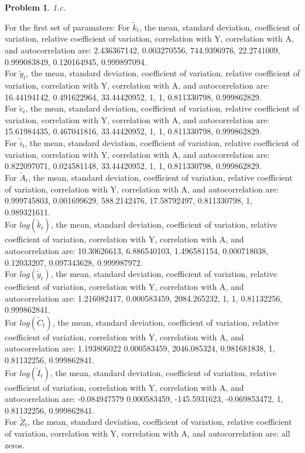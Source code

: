\documentclass{amsart}
\theoremstyle{plain}
\newtheorem{problem}{Problem}
\begin{document}
\begin{problem}
1.c.
\end{problem}
For the first set of paramaters:
For $\tilde{k}_t$, the mean, standard deviation, coefficient of variation, relative coefficient of variation, correlation with Y, correlation with A, and autocorrelation are: 2.436367142,	0.003270556,	744.9396976,	22.2741009,	0.999083849,	0.120164945,	0.999897094.\\
For $\tilde{y}_t$, the mean, standard deviation, coefficient of variation, relative coefficient of variation, correlation with Y, correlation with A, and autocorrelation are: 16.44194142,	0.491622964,	33.44420952,	1,	1,	0.811330798,	0.999862829.
\\
For $\tilde{c}_t$, the mean, standard deviation, coefficient of variation, relative coefficient of variation, correlation with Y, correlation with A, and autocorrelation are: 15.61984435,	0.467041816,	33.44420952,	1,	1,	0.811330798,	0.999862829.
\\
For $\tilde{i}_t$, the mean, standard deviation, coefficient of variation, relative coefficient of variation, correlation with Y, correlation with A, and autocorrelation are: 0.822097071,	0.024581148,	33.44420952,	1,	1,	0.811330798,	0.999862829.\\
For $\tilde{A}_t$, the mean, standard deviation, coefficient of variation, relative coefficient of variation, correlation with Y, correlation with A, and autocorrelation are: 0.999745803,	0.001699629,	588.2142476,	17.58792497,	0.811330798,	1,	0.989321611.\\
For $log(\tilde{k}_t)$, the mean, standard deviation, coefficient of variation, relative coefficient of variation, correlation with Y, correlation with A, and autocorrelation are: 10.30626613,	6.886540103,	1.496581154,	0.000718038,	0.12033207,	0.097343628,	0.999987972.\\
For $log(\tilde{y}_t)$, the mean, standard deviation, coefficient of variation, relative coefficient of variation, correlation with Y, correlation with A, and autocorrelation are: 1.216082417,	0.000583459,	2084.265232,	1,	1,	0.81132256,	0.999862841.\\
For $log(\tilde{C}_t)$, the mean, standard deviation, coefficient of variation, relative coefficient of variation, correlation with Y, correlation with A, and autocorrelation are: 1.193806022	0.000583459,	2046.085324,	0.981681838,	1,	0.81132256,	0.999862841.\\
For $log(\tilde{I}_t)$, the mean, standard deviation, coefficient of variation, relative coefficient of variation, correlation with Y, correlation with A, and autocorrelation are: -0.084947579	0.000583459,	-145.5931623,	-0.069853472,	1,	0.81132256,	0.999862841.\\
For $\tilde{Z}_t$, the mean, standard deviation, coefficient of variation, relative coefficient of variation, correlation with Y, correlation with A, and autocorrelation are: all zeros.\\
\end{document}
